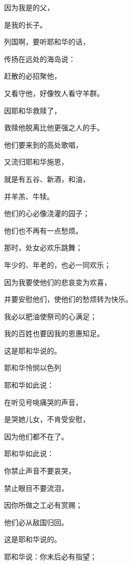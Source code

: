 {\par }{\Q 因为我是{}的父，
\par }{是我的长子。
\par }{\BB \par }{\Q {}列国啊，要听耶和华的话，
\par }{\Q 传扬在远处的海岛说：
\par }{\Q 赶散{}的必招聚他，
\par }{\Q 又看守他，好像牧人看守羊群。
\par }{\Q {}因耶和华救赎了{}，
\par }{\Q 救赎他脱离比他更强之人的手。
\par }{\Q {}他们要来到{}的高处歌唱，
\par }{\Q 又流归耶和华施恩{}，
\par }{\Q 就是有五谷、新酒，和油，
\par }{\Q 并羊羔、牛犊{}。
\par }{\Q 他们的心必像浇灌的园子；
\par }{\Q 他们也不再有一点愁烦。
\par }{\Q {}那时，处女必欢乐跳舞；
\par }{\Q 年少的、年老的，也必一同欢乐；
\par }{\Q 因为我要使他们的悲哀变为欢喜，
\par }{\Q 并要安慰他们，使他们的愁烦转为快乐。
\par }{\Q {}我必以肥油使祭司的心满足；
\par }{\Q 我的百姓也要因我的恩惠知足。
\par }{\Q 这是耶和华说的。
\par }{\SH 耶和华怜悯以色列
\par }{\Q {}耶和华如此说：
\par }{\Q 在{}听见号咷痛哭的声音，
\par }{\Q 是{}哭她儿女，不肯受安慰，
\par }{\Q 因为他们都不在了。
\par }{\BB \par }{\Q {}耶和华如此说：
\par }{\Q 你禁止声音不要哀哭，
\par }{\Q 禁止眼目不要流泪，
\par }{\Q 因你所做之工必有赏赐；
\par }{\Q 他们必从敌国归回。
\par }{\Q 这是耶和华说的。
\par }{\Q {}耶和华说：你末后必有指望；
}
